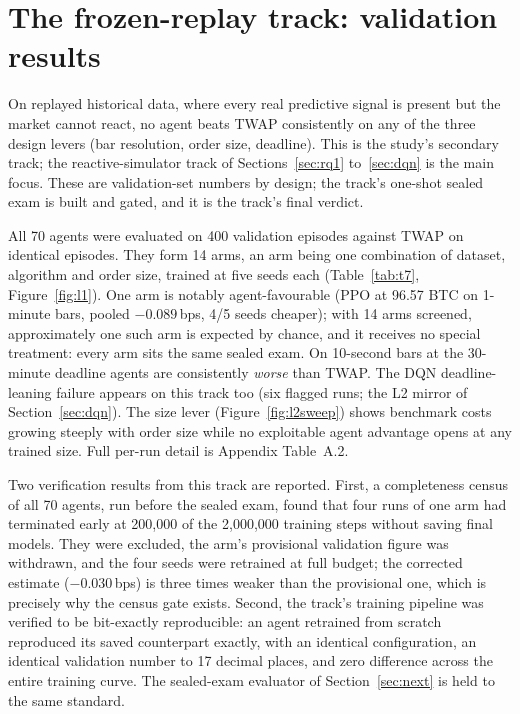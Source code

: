 \documentclass[11pt]{article}
\begin{document}
\clearpage
\section{The frozen-replay track: validation results}\label{sec:l2}

On replayed historical data, where every real predictive signal is
present but the market cannot react, no agent beats TWAP consistently on any of the three
design levers (bar resolution, order size, deadline). This is the study's secondary track; the
reactive-simulator track of Sections~\ref{sec:rq1} to~\ref{sec:dqn} is the main focus. These are validation-set numbers by
design; the track's one-shot sealed exam is built and gated, and it is the track's final
verdict.

All 70 agents were evaluated on 400 validation episodes against TWAP on identical
episodes. They form 14 arms, an arm being one combination of dataset, algorithm and order
size, trained at five seeds each (Table~\ref{tab:t7}, Figure~\ref{fig:l1}). One arm is
notably agent-favourable (PPO at 96.57 BTC on 1-minute bars, pooled $-0.089$\,bps, 4/5
seeds cheaper); with 14 arms screened, approximately one such arm is expected by chance,
and it receives no special treatment: every arm sits the same sealed exam. On 10-second
bars at the 30-minute deadline agents are consistently \emph{worse} than TWAP. The DQN
deadline-leaning failure appears on this track too (six flagged runs; the L2 mirror of
Section~\ref{sec:dqn}). The size lever (Figure~\ref{fig:l2sweep}) shows benchmark costs
growing steeply with order size while no exploitable agent advantage opens at any trained
size. Full per-run detail is Appendix Table~A.2.

Two verification results from this track are reported. First, a completeness census of
all 70 agents, run before the sealed exam, found that four runs of one arm had terminated
early at 200{,}000 of the 2{,}000{,}000 training steps without saving final models. They
were excluded, the arm's provisional validation figure was withdrawn, and the four seeds
were retrained at full budget; the corrected estimate ($-0.030$\,bps) is three times weaker
than the provisional one, which is precisely why the census gate exists. Second, the track's training pipeline was verified to be bit-exactly reproducible: an
agent retrained from scratch reproduced its saved counterpart exactly, with an identical
configuration, an identical validation number to 17 decimal places, and zero difference
across the entire training curve. The sealed-exam evaluator of Section~\ref{sec:next} is
held to the same standard.
\end{document}
